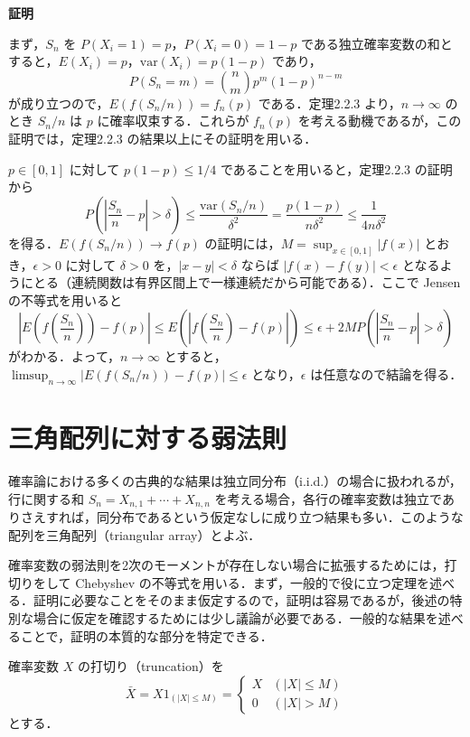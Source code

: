 \documentclass[dvipdfmx]{jsarticle}
\makeatletter
\numberwithin{equation}{section}
\theoremstyle{plain}
\renewenvironment{proof}[1][\proofname]{\par
  \pushQED{\qed}%
  \normalfont \topsep6\p@\@plus6\p@\relax
  \trivlist
  \item\relax
  {\bfseries
  #1\@addpunct{.}}\hspace\labelsep\ignorespaces
}{%
  \popQED\endtrivlist\@endpefalse
}
\renewcommand{\proofname}{証明}
\makeatother
\begin{document}
\begin{proof}
まず，$S_n$ を $P(X_i = 1) = p$，$P(X_i = 0) = 1-p$ である独立確率変数の和とすると，$E(X_i) = p$，$\mathrm{var}(X_i) = p(1-p)$ であり，
\[
  P(S_n = m) = \binom{n}{m} p^m (1-p)^{n-m}
\]
が成り立つので，$E(f(S_n/n)) = f_n(p)$ である．定理2.2.3 より，$n \to \infty$ のとき $S_n/n$ は $p$ に確率収束する．これらが $f_n(p)$ を考える動機であるが，この証明では，定理2.2.3 の結果以上にその証明を用いる．

$p \in [0,1]$ に対して $p(1-p) \le 1/4$ であることを用いると，定理2.2.3 の証明から
\[
  P\!\left(\left|\frac{S_n}{n} - p\right| > \delta\right)
  \le \frac{\mathrm{var}(S_n/n)}{\delta^2}
  = \frac{p(1-p)}{n\delta^2}
  \le \frac{1}{4n\delta^2}
\]
を得る．$E(f(S_n/n)) \to f(p)$ の証明には，$M = \sup_{x \in [0,1]} |f(x)|$ とおき，$\epsilon > 0$ に対して $\delta > 0$ を，$|x - y| < \delta$ ならば $|f(x) - f(y)| < \epsilon$ となるようにとる（連続関数は有界区間上で一様連続だから可能である）．ここで Jensen の不等式を用いると
\[
  \left|E\!\left(f\!\left(\frac{S_n}{n}\right)\right) - f(p)\right|
  \le E\!\left(\left|f\!\left(\frac{S_n}{n}\right) - f(p)\right|\right)
  \le \epsilon + 2M P\!\left(\left|\frac{S_n}{n} - p\right| > \delta\right)
\]
がわかる．よって，$n \to \infty$ とすると，$\limsup_{n\to\infty} |E(f(S_n/n)) - f(p)| \le \epsilon$ となり，$\epsilon$ は任意なので結論を得る．
\end{proof}

\section{三角配列に対する弱法則}

確率論における多くの古典的な結果は独立同分布（i.i.d.）の場合に扱われるが，行に関する和 $S_n = X_{n,1} + \cdots + X_{n,n}$ を考える場合，各行の確率変数は独立でありさえすれば，同分布であるという仮定なしに成り立つ結果も多い．このような配列を三角配列（triangular array）とよぶ．

確率変数の弱法則を2次のモーメントが存在しない場合に拡張するためには，打切りをして Chebyshev の不等式を用いる．まず，一般的で役に立つ定理を述べる．証明に必要なことをそのまま仮定するので，証明は容易であるが，後述の特別な場合に仮定を確認するためには少し議論が必要である．一般的な結果を述べることで，証明の本質的な部分を特定できる．

確率変数 $X$ の打切り（truncation）を
\[
  \bar{X} = X 1_{(|X| \le M)} =
  \begin{cases}
    X & (|X| \le M) \\
    0 & (|X| > M)
  \end{cases}
\]
とする．
\end{document}
